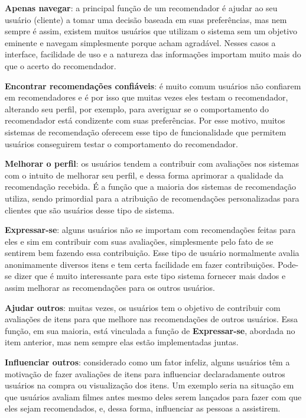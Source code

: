 \textbf{Apenas navegar}: a principal função de um recomendador é ajudar ao seu usuário (cliente) a tomar uma decisão baseada em suas preferências, mas nem sempre é assim, existem muitos usuários que utilizam o sistema sem um objetivo eminente e navegam simplesmente porque acham agradável. Nesses casos a interface, facilidade de uso e a natureza das informações importam muito mais do que o acerto do recomendador.

\textbf{Encontrar recomendações confiáveis}: é muito comum usuários não confiarem em recomendadores e é por isso que muitas vezes eles testam o recomendador, alterando seu perfil, por exemplo, para averiguar se o comportamento do recomendador está condizente com suas preferências. Por esse motivo, muitos sistemas de recomendação oferecem esse tipo de funcionalidade que permitem usuários conseguirem testar o comportamento do recomendador.

\textbf{Melhorar o perfil}: os usuários tendem a contribuir com avaliações nos sistemas com o intuito de melhorar seu perfil, e dessa forma aprimorar a qualidade da recomendação recebida. É a função que a maioria dos sistemas de recomendação utiliza, sendo primordial para a atribuição de recomendações personalizadas para clientes que são usuários desse tipo de sistema.

\textbf{Expressar-se}: alguns usuários não se importam com recomendações feitas para eles e sim em contribuir com suas avaliações, simplesmente pelo fato de se sentirem bem fazendo essa contribuição. Esse tipo de usuário normalmente avalia anonimamente diversos itens e tem certa facilidade em fazer contribuições. Pode-se dizer que é muito interessante para este tipo sistema fornecer mais dados e assim melhorar as recomendações para os outros usuários.

\textbf{Ajudar outros}: muitas vezes, os usuários tem o objetivo de contribuir com avaliações de itens para que melhore nas recomendações de outros usuários. Essa função, em sua maioria, está vinculada a função de \textbf{Expressar-se}, abordada no item anterior, mas nem sempre elas estão implementadas juntas.

\textbf{Influenciar outros}: considerado como um fator infeliz, alguns usuários têm a motivação de fazer avaliações de itens para influenciar declaradamente outros usuários na compra ou visualização dos itens. Um exemplo seria na situação em que usuários avaliam filmes antes mesmo deles serem lançados para fazer com que eles sejam recomendados, e, dessa forma, influenciar as pessoas a assistirem.

